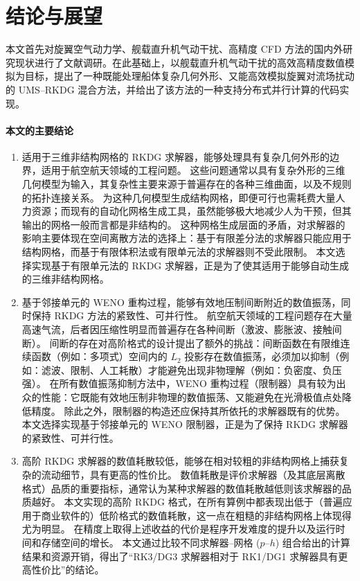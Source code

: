 
\chapter*{结论与展望}


本文首先对旋翼空气动力学、舰载直升机气动干扰、高精度 CFD 方法的国内外研究现状进行了文献调研。在此基础上，以舰载直升机气动干扰的高效高精度数值模拟为目标，提出了一种既能处理船体复杂几何外形、又能高效模拟旋翼对流场扰动的
UMS–RKDG 混合方法，并给出了该方法的一种支持分布式并行计算的代码实现。

\subsubsection*{本文的主要结论}
\begin{enumerate}[wide]
\item 适用于三维非结构网格的 RKDG 求解器，能够处理具有复杂几何外形的边界，适用于航空航天领域的工程问题。
这些问题通常以具有复杂外形的三维几何模型为输入，其复杂性主要来源于普遍存在的各种三维曲面，以及不规则的拓扑连接关系。
为这种几何模型生成结构网格，即便可行也需耗费大量人力资源；而现有的自动化网格生成工具，虽然能够极大地减少人为干预，但其输出的网格一般而言都是非结构的。
这种网格生成层面的矛盾，对求解器的影响主要体现在空间离散方法的选择上：基于有限差分法的求解器只能应用于结构网格，而基于有限体积法或有限单元法的求解器则不受此限制。
本文选择实现基于有限单元法的 RKDG 求解器，正是为了使其适用于能够自动生成的三维非结构网格。

\item 基于邻接单元的 WENO 重构过程，能够有效地压制间断附近的数值振荡，同时保持 RKDG 方法的紧致性、可并行性。
航空航天领域的工程问题存在大量高速气流，后者因压缩性明显而普遍存在各种间断（激波、膨胀波、接触间断）。
间断的存在对高阶格式的设计提出了额外的挑战：间断函数在有限维连续函数（例如：多项式）空间内的 $L_2$ 投影存在数值振荡，必须加以抑制（例如：滤波、限制、人工耗散）才能避免出现非物理解（例如：负密度、负压强）。
在所有数值振荡抑制方法中，WENO 重构过程（限制器）具有较为出众的性能：它既能有效地压制非物理的数值振荡、又能避免在光滑极值点处降低精度。
除此之外，限制器的构造还应保持其所依托的求解器既有的优势。本文选择实现基于邻接单元的 WENO 限制器，正是为了保持 RKDG 求解器的紧致性、可并行性。

\item 高阶 RKDG 求解器的数值耗散较低，能够在相对较粗的非结构网格上捕获复杂的流动细节，具有更高的性价比。
数值耗散是评价求解器（及其底层离散格式）品质的重要指标，通常认为某种求解器的数值耗散越低则该求解器的品质越好。
本文实现的高阶 RKDG 格式，在所有算例中都表现出低于（普遍应用于商业软件的）低阶格式的数值耗散，这一点在粗糙的非结构网格上体现得尤为明显。
在精度上取得上述收益的代价是程序开发难度的提升以及运行时间和存储空间的增长。
本文通过比较不同求解器--网格 ($p$--$h$) 组合给出的计算结果和资源开销，得出了“RK3/DG3 求解器相对于 RK1/DG1 求解器具有更高性价比”的结论。

\end{enumerate}


